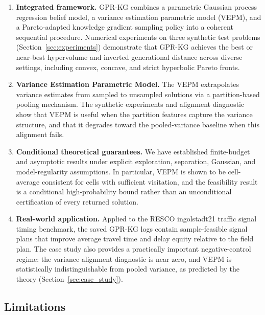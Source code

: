 \documentclass[12pt]{article}
\theoremstyle{plain}
\theoremstyle{definition}
\theoremstyle{remark}
\begin{document}
\begin{enumerate}[label=(\roman*),leftmargin=2.5em]
  \item \textbf{Integrated framework.}  GPR-KG combines a parametric
    Gaussian process regression belief model, a variance estimation
    parametric model (VEPM), and a Pareto-adapted knowledge gradient
    sampling policy into a coherent sequential procedure.  Numerical
    experiments on three synthetic test problems (Section~\ref{sec:experiments})
    demonstrate that GPR-KG achieves the best or near-best hypervolume
    and inverted generational distance across diverse settings, including
    convex, concave, and strict hyperbolic Pareto fronts.

  \item \textbf{Variance Estimation Parametric Model.}  The VEPM
    extrapolates variance estimates from sampled to unsampled solutions
    via a partition-based pooling mechanism.  The synthetic experiments
    and alignment diagnostic show that VEPM is useful when the partition
    features capture the variance structure, and that it degrades toward
    the pooled-variance baseline when this alignment fails.

  \item \textbf{Conditional theoretical guarantees.}  We have established
    finite-budget and asymptotic results under explicit exploration,
    separation, Gaussian, and model-regularity assumptions.  In
    particular, VEPM is shown to be cell-average consistent for cells
    with sufficient visitation, and the feasibility result is a
    conditional high-probability bound rather than an unconditional
    certification of every returned solution.

  \item \textbf{Real-world application.}  Applied to the RESCO
    ingolstadt21 traffic signal timing benchmark, the saved GPR-KG logs
    contain sample-feasible signal plans that improve average travel time
    and delay equity relative to the field plan.  The case study also provides a
    practically important negative-control regime: the variance
    alignment diagnostic is near zero, and VEPM is statistically
    indistinguishable from pooled variance, as predicted by the theory
    (Section~\ref{sec:case_study}).
\end{enumerate}


\subsection{Limitations}\label{subsec:limitations}
\end{document}
